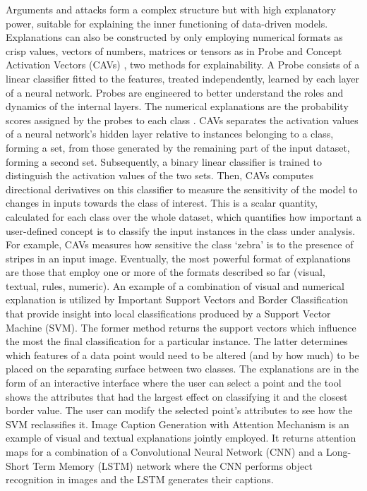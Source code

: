 \documentclass[final,1p,times]{elsarticle}
\begin{document}
Arguments and attacks form a complex structure but with high explanatory power, suitable for explaining the inner functioning of data-driven models.
Explanations can also be constructed by only employing numerical formats as crisp values, vectors of numbers, matrices or tensors as in Probe \cite{alain2017understanding} and Concept Activation Vectors (CAVs) \cite{kim2018interpretability}, two methods for explainability. A Probe consists of a linear classifier fitted to the features, treated independently, learned by each layer of a neural network. Probes are engineered to better understand the roles and dynamics of the internal layers. The numerical explanations are the probability scores assigned by the probes to each class \cite{alain2017understanding}. 
CAVs separates the activation values of a neural network's hidden layer relative to instances belonging to a class, forming a set, from those generated by the remaining part of the input dataset, forming a second set. Subsequently, a binary linear classifier is trained to distinguish the activation values of the two sets. Then, CAVs computes directional derivatives on this classifier to measure the sensitivity of the model to changes in inputs towards the class of interest. This is a scalar quantity, calculated for each class over the whole dataset, which quantifies how important a user-defined concept is to classify the input instances in the class under analysis. For example, CAVs measures how sensitive the class `zebra' is to the presence of stripes in an input image.
Eventually, the most powerful format of explanations are those that employ one or more of the formats described so far (visual, textual, rules, numeric). An example of a combination of visual and numerical explanation is utilized by Important Support Vectors and Border Classification \cite{barbella2009understanding} that provide insight into local classifications produced by a Support Vector Machine (SVM). The former method returns the support vectors which influence the most the final classification for a particular instance. The latter determines which features of a data point would need to be altered (and by how much) to be placed on the separating surface between two classes. The explanations are in the form of an interactive interface where the user can select a point and the tool shows the attributes that had the largest effect on classifying it and the closest border value. The user can modify the selected point's attributes to see how the SVM reclassifies it.
Image Caption Generation with Attention Mechanism \cite{xuk2015show} is an example of visual and textual explanations jointly employed. It returns attention maps for a combination of a Convolutional Neural Network (CNN) and a Long-Short Term Memory (LSTM) network where the CNN performs object recognition in images and the LSTM generates their captions. 
\end{document}
